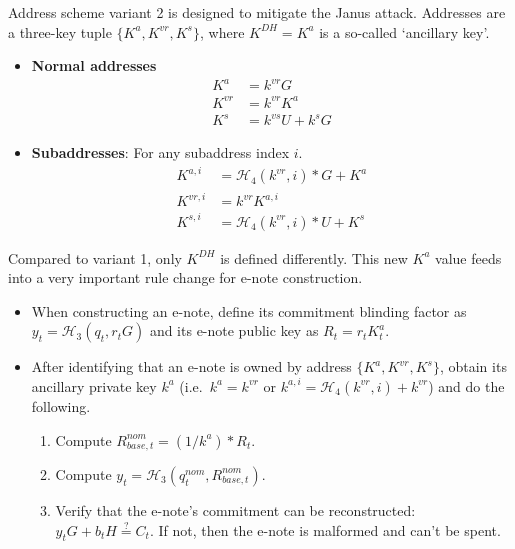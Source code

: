 Address scheme variant 2 is designed to mitigate the Janus attack. Addresses are a three-key tuple $\{K^a, K^{vr}, K^s\}$, where $K^{DH} = K^a$ is a so-called `ancillary key'.

\begin{itemize}
    \item \textbf{Normal addresses}
    \begin{align*}
        K^a &= k^{vr} G  \\
        K^{vr} &= k^{vr} K^a  \\
        K^{s} &= k^{vs} U + k^s G
    \end{align*}

    \item \textbf{Subaddresses}: For any subaddress index $i$.\vspace{.115cm}
    \begin{align*}
        K^{a,i} &= \mathcal{H}_4(k^{vr},i)*G + K^a  \\
        K^{vr,i} &= k^{vr} K^{a,i}  \\
        K^{s,i} &= \mathcal{H}_4(k^{vr},i)*U + K^s
    \end{align*}
\end{itemize}

Compared to variant 1, only $K^{DH}$ is defined differently. This new $K^a$ value feeds into a very important rule change for e-note construction.

\begin{itemize}
    \item When constructing an e-note, define its commitment blinding factor as $y_t = \mathcal{H}_3(q_t, r_t G)$ and its e-note public key as $R_t = r_t K^a_t$.

    \item After identifying that an e-note is owned by address $\{K^a, K^{vr}, K^s\}$, obtain its ancillary private key $k^a$ (i.e.\ $k^a = k^{vr}$ or $k^{a,i} = \mathcal{H}_4(k^{vr},i) + k^{vr}$) and do the following.
    \begin{enumerate}
        \item Compute $R^{nom}_{base,t} = (1/k^a)*R_t$.
        \item Compute $y_t = \mathcal{H}_3(q^{nom}_t, R^{nom}_{base,t})$.
        \item Verify that the e-note's commitment can be reconstructed: $y_t G + b_t H \stackrel{?}{=} C_t$. If not, then the e-note is malformed and can't be spent.
    \end{enumerate}
\end{itemize}

